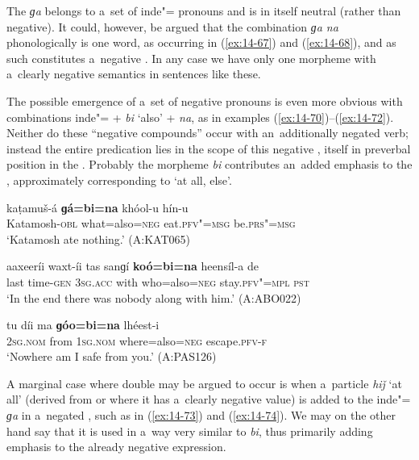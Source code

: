 The  \textit{ɡa} belongs to a~set of inde"= pronouns and is in itself neutral (rather than negative). It could, however, be argued that the combination \textit{ɡa na} phonologically is one word, as occurring in (\ref{ex:14-67}) and (\ref{ex:14-68}), and as such constitutes a~negative . In any case we have only one morpheme with a~clearly negative semantics in sentences like these. 



The possible emergence of a~set of negative pronouns is even more obvious with combinations inde"=  + \textit{bi} `also' + \textit{na}, as in examples (\ref{ex:14-70})--(\ref{ex:14-72}). Neither do these ``negative compounds'' occur with an~additionally negated verb; instead the entire predication lies in the scope of this negative , itself in preverbal position in the . Probably the morpheme \textit{bi} contributes an~added emphasis to the , approximately corresponding to `at all, else'.

\begin{exe}
\ex
\label{ex:14-70}
\gll kaṭamuš-á \textbf{ɡá=bi=na} khóol-u hín-u \\
Katamosh-\textsc{obl} what=also=\textsc{neg} eat.\textsc{pfv"=msg } be.\textsc{prs"=msg} \\
\glt `Katamosh ate nothing.' (A:KAT065)

\ex
\label{ex:14-71}
\gll aaxeeríi waxt-íi tas sanɡí \textbf{koó=bi=na} heensíl-a  de \\
last time-\textsc{gen} \textsc{3sg.acc} with who=also=\textsc{neg} stay.\textsc{pfv"=mpl}  \textsc{pst} \\
\glt `In the end there was nobody along with him.' (A:ABO022)

\ex
\label{ex:14-72}
\gll tu díi ma \textbf{ɡóo=bi=na} lhéest-i \\
\textsc{2sg.nom} from \textsc{1sg.nom} where=also=\textsc{neg} escape.\textsc{pfv-f}  \\
\glt `Nowhere am I safe from you.' (A:PAS126)
\end{exe}

A marginal case where double  may be argued to occur is when a~particle \textit{hiǰ} `at all' (derived from \iliPersian or \iliPashto where it has a~clearly negative value) is added to the inde"= \textit{ɡa} in a~negated , such as in (\ref{ex:14-73}) and (\ref{ex:14-74}). We may on the other hand say that it is used in a~way very similar to \textit{bi}, thus primarily adding emphasis to the already negative expression.

